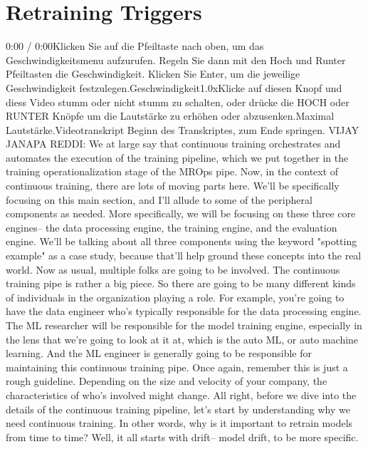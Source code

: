 {{{{\section{Retraining Triggers}

    0:00 / 0:00Klicken Sie auf die Pfeiltaste nach oben, um das Geschwindigkeitsmenu aufzurufen. Regeln Sie dann mit den Hoch und Runter Pfeiltasten die Geschwindigkeit. Klicken Sie Enter, um die jeweilige Geschwindigkeit festzulegen.Geschwindigkeit1.0xKlicke auf diesen Knopf und diess Video stumm oder nicht stumm zu schalten, oder drücke die HOCH oder RUNTER Knöpfe um die Lautstärke zu erhöhen oder abzusenken.Maximal Lautstärke.Videotranskript
    Beginn des Transkriptes, zum Ende springen.
    VIJAY JANAPA REDDI: We at large say that continuous training orchestrates
    and automates the execution of the training pipeline, which
    we put together in the training operationalization stage of the MROps
    pipe.
    Now, in the context of continuous training,
    there are lots of moving parts here.
    We'll be specifically focusing on this main section,
    and I'll allude to some of the peripheral components as needed.
    More specifically, we will be focusing on these three core engines--
    the data processing engine, the training engine, and the evaluation engine.
    We'll be talking about all three components using
    the keyword "spotting example" as a case study,
    because that'll help ground these concepts into the real world.
    Now as usual, multiple folks are going to be involved.
    The continuous training pipe is rather a big piece.
    So there are going to be many different kinds of individuals
    in the organization playing a role.
    For example, you're going to have the data
    engineer who's typically responsible for the data processing engine.
    The ML researcher will be responsible for the model training engine,
    especially in the lens that we're going to look at it at, which is the auto ML,
    or auto machine learning.
    And the ML engineer is generally going to be responsible for maintaining
    this continuous training pipe.
    Once again, remember this is just a rough guideline.
    Depending on the size and velocity of your company,
    the characteristics of who's involved might change.
    All right, before we dive into the details of the continuous training
    pipeline, let's start by understanding why we need continuous training.
    In other words, why is it important to retrain models from time to time?
    Well, it all starts with drift--
    model drift, to be more specific.
}}}}
